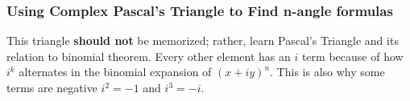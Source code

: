 \documentclass{article}
\begin{document}
\subsubsection{Using Complex Pascal's Triangle to Find n-angle formulas}
\vspace{5mm}

\vspace{5mm}
\noindent This triangle \textbf{should not} be memorized; rather, learn Pascal's Triangle and its relation to binomial theorem. Every other element has an $i$ term because of how $i^k$ alternates in the binomial expansion of $(x+iy)^n$. This is also why some terms are negative $i^2=-1$ and $i^3=-i$.
\end{document}
